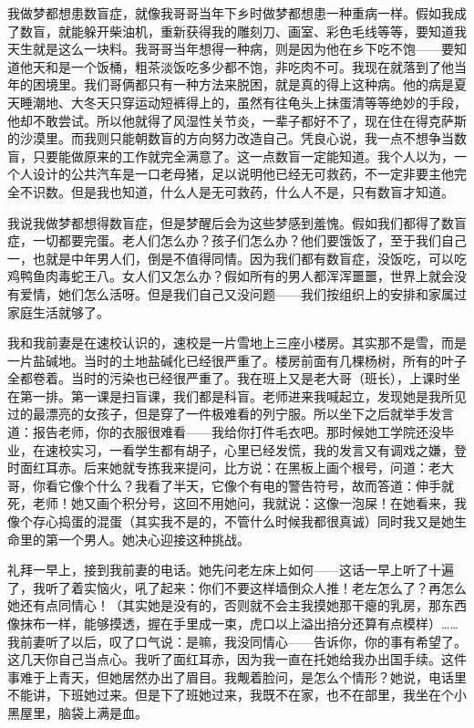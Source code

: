 我做梦都想患数盲症，就像我哥哥当年下乡时做梦都想患一种重病一样。假如我成了数盲，就能躲开柴油机，重新获得我的雕刻刀、画室、彩色毛线等等，要知道我天生就是这么一块料。我哥哥当年想得一种病，则是因为他在乡下吃不饱——要知道他天和是一个饭桶，粗茶淡饭吃多少都不饱，非吃肉不可。我现在就落到了他当年的困境里。我们哥俩都只有一种方法来脱困，就是真的得上这种病。他的病是夏天睡潮地、大冬天只穿运动短裤得上的，虽然有往龟头上抹蛋清等等绝妙的手段，他却不敢尝试。所以他就得了风湿性关节炎，一辈子都好不了，现在住在得克萨斯的沙漠里。而我则只能朝数盲的方向努力改造自己。凭良心说，我一点不想争当数盲，只要能做原来的工作就完全满意了。这一点数盲一定能知道。我个人以为，一个人设计的公共汽车是一口老母猪，足以说明他已经无可救药，不一定非要主他完全不识数。但是我也知道，什么人是无可救药，什么人不是，只有数盲才知道。 

我说我做梦都想得数盲症，但是梦醒后会为这些梦感到羞愧。假如我们都得了数盲症，一切都要完蛋。老人们怎么办？孩子们怎么办？他们要饿饭了，至于我们自己一，也就是中年男人们，倒是不值得同情。因为我们都有数盲症，没饭吃，可以吃鸡鸭鱼肉毒蛇王八。女人们又怎么办？假如所有的男人都浑浑噩噩，世界上就会没有爱情，她们怎么活呀。但是我们自己又没问题——我们按组织上的安排和家属过家庭生活就够了。 

我和我前妻是在速校认识的，速校是一片雪地上三座小楼房。其实那不是雪，而是一片盐碱地。当时的土地盐碱化已经很严重了。楼房前面有几棵杨树，所有的叶子全都卷着。当时的污染也已经很严重了。我在班上又是老大哥（班长），上课时坐在第一排。第一课是扫盲课，我们都是科盲。老师进来我喊起立，发现她是我所见过的最漂亮的女孩子，但是穿了一件极难看的列宁服。所以坐下之后就举手发言道：报告老师，你的衣服很难看——我给你打件毛衣吧。那时候她工学院还没毕业，在速校实习，一看学生都有胡子，心里已经发慌，我的发言又有调戏之嫌，登时面红耳赤。后来她就专拣我来提问，比方说：在黑板上画个根号，问道：老大哥，你看它像个什么？我看了半天，它像个有电的警告符号，故而答道：伸手就死，老师！她又画个积分号，这回不用她问，我就说：这像一泡屎！在她看来，我像个存心捣蛋的混蛋（其实我不是的，不管什么时候我都很真诚）同时我又是她生命里的第一个男人。她决心迎接这种挑战。 

礼拜一早上，接到我前妻的电话。她先问老左床上如何——这话一早上听了十遍了，我听了着实恼火，吼了起来：你们不要这样墙倒众人推！老左怎么了？再怎么她还有点同情心！（其实她是没有的，否则就不会主我摸她那干瘪的乳房，那东西像抹布一样，能够摸透，握在手里成一束，虎口以上溢出掊分还算有点模样）……我前妻听了以后，叹了口气说：是嘛，我没同情心——告诉你，你的事有希望了。这几天你自己当点心。我听了面红耳赤，因为我一直在托她给我办出国手续。这件事难于上青天，但她居然办出了眉目。我觍着脸问，是怎么个情形？她说，电话里不能讲，下班她过来。但是下了班她过来，我既不在家，也不在部里，我坐在个小黑屋里，脑袋上满是血。 



